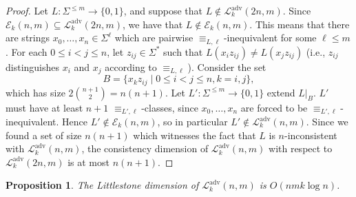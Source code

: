 \documentclass[11pt,a4paper]{amsart}
\newtheorem{proposition}{Proposition}
\theoremstyle{definition}
\newcommand{\mc}{\mathcal}
\begin{document}
\begin{proof}
    Let $L : \Sigma^{\leq m} \to \{0,1\}$, and suppose that $L \notin \mc L^{\text{adv}}_k(2n,m)$. 
    Since $\mc E_k(n,m) \subseteq \mc L^{\text{adv}}_k(2n,m)$, we have that $L \notin \mc E_k(n,m)$.
    This means that there are strings $x_0, \ldots, x_n \in \Sigma^\ell$ which are pairwise $\equiv_{L,\ell}$-inequivalent for some $\ell \leq m$. 
    For each $0 \leq i < j \leq n$, let $z_{ij} \in \Sigma^*$ such that $L(x_i z_{ij}) \neq L(x_j z_{ij})$ (i.e., $z_{ij}$ distinguishes $x_i$ and $x_j$ according to $\equiv_{L,\ell}$). 
    Consider the set 
    \[
        B = \{x_k z_{ij} \mid 0 \leq i < j \leq n, k = i,j\},
    \]
    which has size $2 \binom{n+1}{2} = n(n+1)$. 
    Let $L' : \Sigma^{\leq m} \to \{0,1\}$ extend $L|_B$.
    $L'$ must have at least $n+1$ $\equiv_{L',\ell}$-classes, since $x_0, \ldots, x_n$ are forced to be $\equiv_{L',\ell}$-inequivalent. 
    Hence $L' \notin \mc E_k(n,m)$, so in particular $L' \notin \mc L^{\text{adv}}_k(n,m)$.
    Since we found a set of size $n(n+1)$ which witnesses the fact that $L$ is $n$-inconsistent with $\mc L^{\text{adv}}_k(n,m)$, the consistency dimension of $\mc L^{\text{adv}}_k(n,m)$ with respect to $\mc L^{\text{adv}}_k(2n,m)$ is at most $n(n+1)$. 
\end{proof}

\begin{proposition} \label{prop:Ldim of DFAs with advice}
    The Littlestone dimension of $\mc L^{\text{adv}}_k(n,m)$ is $O(nmk \log n)$. 
\end{proposition}
\end{document}
